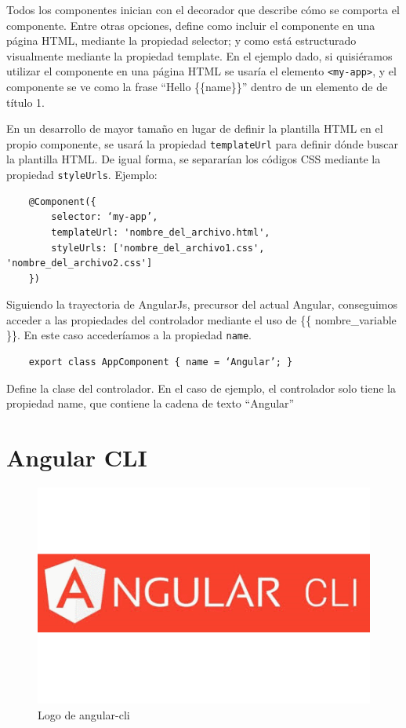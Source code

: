 \documentclass[openright,twoside,10pt]{book}
\begin{document}
    Todos los componentes inician con el decorador \textcite{Component} que
    describe cómo se comporta el componente. Entre otras opciones, define
    como incluir el componente en una página HTML, mediante la propiedad
    selector; y como está estructurado visualmente mediante la propiedad
    template. En el ejemplo dado, si quisiéramos utilizar el componente en
    una página HTML se usaría el elemento
    \texttt{\textless{}my-app\textgreater{}}, y el componente se ve como la
    frase ``Hello \{\{name\}\}'' dentro de un elemento de de título 1.
    
    En un desarrollo de mayor tamaño en lugar de definir la plantilla HTML
    en el propio componente, se usará la propiedad \texttt{templateUrl} para
    definir dónde buscar la plantilla HTML. De igual forma, se separarían
    los códigos CSS mediante la propiedad \texttt{styleUrls}. Ejemplo:
    
    \begin{verbatim}
    @Component({
        selector: ‘my-app’,    
        templateUrl: 'nombre_del_archivo.html',
        styleUrls: ['nombre_del_archivo1.css', 'nombre_del_archivo2.css']
    })
    \end{verbatim}
    
    Siguiendo la trayectoria de AngularJs, precursor del actual Angular,
    conseguimos acceder a las propiedades del controlador mediante el uso de
    \{\{ nombre\_variable \}\}. En este caso accederíamos a la propiedad
    \texttt{name}.
    
    \begin{verbatim}
    export class AppComponent { name = ‘Angular’; }
    \end{verbatim}
    
    Define la clase del controlador. En el caso de ejemplo, el controlador
    solo tiene la propiedad name, que contiene la cadena de texto
    ``Angular''
    
    \section{Angular CLI}\label{angular-cli}
    
    \begin{figure}[H]
        \begin{center}
            \includegraphics[scale=0.3]{img/angular-cli.png}
        \end{center}
        \caption{Logo de angular-cli}
    \end{figure}
    
\end{document}
